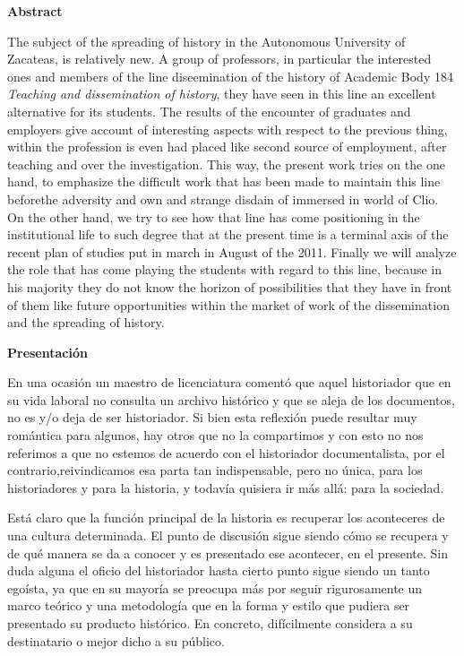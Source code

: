 \bigskip
\textbf{Abstract}

The subject of the spreading of history in the Autonomous University of
Zacateas, is relatively new. A group of professors, in particular the
interested ones and members of the line diseemination of the history of
Academic Body 184 \textit{Teaching and dissemination of history}, they have seen in
this line an excellent alternative for its students. The results of the
encounter of graduates and employers give account of interesting aspects with
respect to the previous thing, within the profession is even had placed like
second source of employment, after teaching and over the investigation. This
way, the present work tries on the one hand, to emphasize the difficult work
that has been made to maintain this line beforethe adversity and own and
strange disdain of immersed in world of Clio. On the other hand, we try to see
how that line has come positioning in the institutional life to such degree
that at the present time is a terminal axis of the recent plan of studies put in
march in August of the 2011. Finally we will analyze the role that has come
playing the students with regard to this line, because in his majority they do
not know the horizon of possibilities that they have in front of them like
future opportunities within the market of work of the dissemination and the
spreading of history.

\bigskip
\textbf{Presentación}

En una ocasión un maestro de licenciatura comentó que aquel historiador que en
su vida laboral no consulta un archivo histórico y que se aleja de los
documentos, no es y\slash{}o deja de ser historiador. Si bien esta reflexión puede
resultar muy romántica para algunos, hay otros que no la compartimos y con esto
no nos referimos a que no estemos de acuerdo con el historiador documentalista,
por el contrario,\linebreak reivindicamos esa parta tan indispensable, pero no única, para
los historiadores y para la historia, y todavía quisiera ir más allá: para la
sociedad.

Está claro que la función principal de la historia es recuperar los aconteceres
de una cultura determinada. El punto de discusión sigue siendo cómo se recupera
y de qué manera se da a conocer y es presentado ese acontecer, en el presente.
Sin duda alguna el oficio del historiador hasta cierto punto sigue siendo un
tanto egoísta, ya que en su mayoría se preocupa más por seguir rigurosamente un
marco teórico y una metodología que en la forma y estilo que pudiera ser
presentado su producto histórico. En concreto, difícilmente considera a su
destinatario o mejor dicho a su público.


